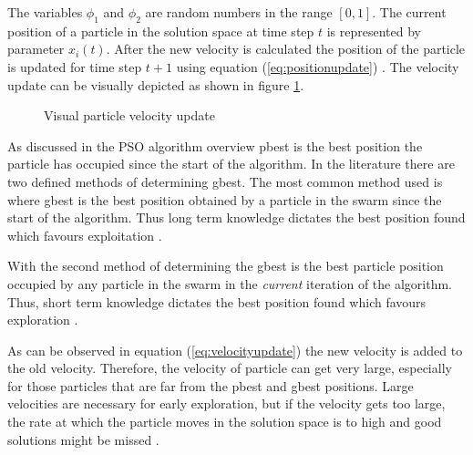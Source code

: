 The variables $\phi_1$ and $\phi_2$ are random numbers in the range $[0,1]$. The current position of a particle in the solution space at time step $t$ is represented by parameter $x_i(t)$\cite{FundamentalSwarm,CompuIntelligenceIntro}. After the new velocity is calculated the position of the particle is updated for time step $t+1$ using equation (\ref{eq:positionupdate}) \cite{FundamentalSwarm,CompuIntelligenceIntro}. The velocity update can be visually depicted as shown in figure \ref{fig:particleVelocityUpdate}. 
\begin{figure}[h]
	\centering
	\setlength \fboxsep{0pt}
	\setlength \fboxrule{0.5pt}
	\caption{Visual particle velocity update \cite{SOSwarm,FundamentalSwarm,CompuIntelligenceIntro,PSOSelfHierarch}}

	\label{fig:particleVelocityUpdate}
\end{figure}

As discussed in the PSO algorithm overview pbest is the best position the particle has occupied since the start of the algorithm. In the literature there are two defined methods of determining gbest. The most common method used is where gbest is the best position obtained by a particle in the swarm since the start of the algorithm. Thus long term knowledge dictates the best position found which favours exploitation \cite{CompuIntelligenceIntro,FundamentalSwarm}.

With the second method of determining the gbest is the best particle position occupied by any particle in the swarm in the \emph{current} iteration of the algorithm. Thus, short term knowledge dictates the best position found which favours exploration \cite{CompuIntelligenceIntro,FundamentalSwarm}.

As can be observed in equation (\ref{eq:velocityupdate}) the new velocity is added to the old velocity. Therefore, the velocity of particle can get very large, especially for those particles that are far from the pbest and gbest positions. Large velocities are necessary for early exploration, but if the velocity gets too large, the rate at which the particle moves in the solution space is to high and good solutions might be missed \cite{FundamentalSwarm}.

